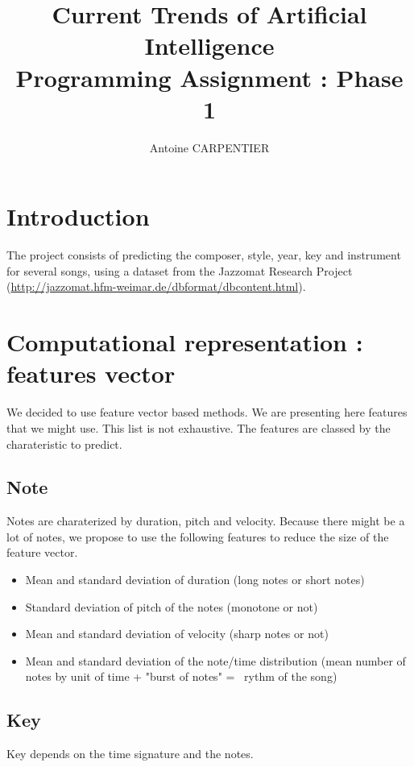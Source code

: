\documentclass[a4paper,12pt]{article}
\author{Antoine CARPENTIER}
\title{Current Trends of Artificial Intelligence\\ \small Programming Assignment : Phase 1}
\begin{document}
\maketitle

\section{Introduction}

The project consists of predicting the composer, style, year, key and instrument for several songs, using a dataset from the Jazzomat Research Project (\url{http://jazzomat.hfm-weimar.de/dbformat/dbcontent.html}).

\section{Computational representation : features vector}

We decided to use feature vector based methods. We are presenting here features that we might use. This list is not exhaustive. The features are classed by the charateristic to predict.

\subsection{Note}

Notes are charaterized by duration, pitch and velocity. Because there might be a lot of notes, we propose to use the following features to reduce the size of the feature vector.

\begin{itemize}
    \item Mean and standard deviation of duration (long notes or short notes)
    \item Standard deviation of pitch of the notes (monotone or not)
    \item Mean and standard deviation of velocity (sharp notes or not)
    \item Mean and standard deviation of the note/time distribution (mean number of notes by unit of time + "burst of notes" =~ rythm of the song) 
\end{itemize}

\subsection{Key}

Key depends on the time signature and the notes. 
\end{document}

